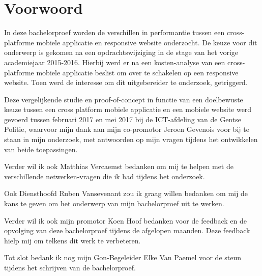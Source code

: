 
\chapter*{Voorwoord}
\label{ch:voorwoord}


In deze bachelorproef worden de verschillen in performantie tussen een cross-platforme mobiele applicatie en responsive website onderzocht.
De keuze voor dit onderwerp is gekomen na een opdrachtswijziging in de stage van het vorige academiejaar 2015-2016. Hierbij werd er na
een kosten-analyse van een cross-platforme mobiele applicatie beslist om over te schakelen op een responsive website. Toen werd de
interesse om dit uitgebereider te onderzoek, getriggerd.

Deze vergelijkende studie en proof-of-concept in functie van een doelbewuste keuze tussen een cross platform mobiele applicatie en
een mobiele website werd gevoerd tussen februari 2017 en mei 2017 bij de ICT-afdeling van de Gentse Politie, waarvoor mijn dank aan mijn
co-promotor Jeroen Gevenois voor bij te staan in mijn onderzoek, met antwoorden op mijn vragen tijdens het ontwikkelen van beide toepassingen.

Verder wil ik ook Matthias Vercaemst bedanken om mij te helpen met de verschillende netwerken-vragen die ik had tijdens het onderzoek.

Ook Diensthoofd Ruben Vansevenant zou ik graag willen bedanken om mij de kans te geven om het onderwerp van mijn bachelorproef uit te werken.

Verder wil ik ook mijn promotor Koen Hoof bedanken voor de feedback en de opvolging van deze bachelorproef tijdens de afgelopen maanden.
Deze feedback hielp mij om telkens dit werk te verbeteren.

Tot slot bedank ik nog mijn Gon-Begeleider Elke Van Paemel voor de steun tijdens het schrijven van de bachelorproef.

